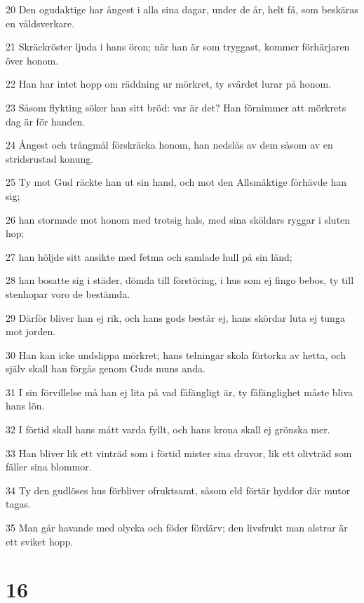 \par 20 Den ogudaktige har ångest i alla sina dagar, under de år, helt få, som beskäras en våldsverkare.
\par 21 Skräckröster ljuda i hans öron; när han är som tryggast, kommer förhärjaren över honom.
\par 22 Han har intet hopp om räddning ur mörkret, ty svärdet lurar på honom.
\par 23 Såsom flykting söker han sitt bröd: var är det? Han förnimmer att mörkrets dag är för handen.
\par 24 Ångest och trångmål förskräcka honom, han nedslås av dem såsom av en stridsrustad konung.
\par 25 Ty mot Gud räckte han ut sin hand, och mot den Allsmäktige förhävde han sig;
\par 26 han stormade mot honom med trotsig hals, med sina sköldars ryggar i sluten hop;
\par 27 han höljde sitt ansikte med fetma och samlade hull på sin länd;
\par 28 han bosatte sig i städer, dömda till förstöring, i hus som ej fingo bebos, ty till stenhopar voro de bestämda.
\par 29 Därför bliver han ej rik, och hans gods består ej, hans skördar luta ej tunga mot jorden.
\par 30 Han kan icke undslippa mörkret; hans telningar skola förtorka av hetta, och själv skall han förgås genom Guds muns anda.
\par 31 I sin förvillelse må han ej lita på vad fåfängligt är, ty fåfänglighet måste bliva hans lön.
\par 32 I förtid skall hans mått varda fyllt, och hans krona skall ej grönska mer.
\par 33 Han bliver lik ett vinträd som i förtid mister sina druvor, lik ett olivträd som fäller sina blommor.
\par 34 Ty den gudlöses hus förbliver ofruktsamt, såsom eld förtär hyddor där mutor tagas.
\par 35 Man går havande med olycka och föder fördärv; den livsfrukt man alstrar är ett sviket hopp.

\chapter{16}

